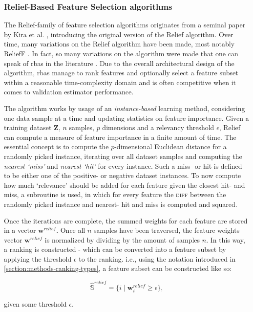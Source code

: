 \documentclass[../main.tex]{subfiles}
\begin{document}
\subsubsection{Relief-Based Feature Selection algorithms}
The Relief-family of feature selection algorithms originates from a seminal paper by Kira et al. \citep{kira_feature_1992}, introducing the original version of the Relief algorithm. Over time, many variations on the Relief algorithm have been made, most notably ReliefF \citep{kononenko_estimating_1994}. In fact, so many variations on the algorithm were made that one can speak of \glspl{rba} in the literature \citep{urbanowicz_relief-based_2018}. Due to the overall architectural design of the algorithm, \glspl{rba} manage to rank features and optionally select a feature subset within a reasonable time-complexity domain and is often competitive when it comes to validation estimator performance.

The algorithm works by usage of an \textit{instance-based} learning method, considering one data sample at a time and updating statistics on feature importance. Given a training dataset $\mathbf{Z}$, $n$ samples, $p$ dimensions and a relevancy threshold $\epsilon$, Relief can compute a measure of feature importance in a finite amount of time. The essential concept is to compute the $p$-dimensional Euclidean distance for a randomly picked instance, iterating over all dataset samples and computing the \textit{nearest `miss'} and \textit{nearest `hit'} for every instance. Such a miss- or hit is defined to be either one of the positive- or negative dataset instances. To now compute how much `relevance' should be added for each feature given the closest hit- and miss, a subroutine is used, in which for every feature the \textsc{diff} between the randomly picked instance and nearest- hit and miss is computed and squared.

Once the iterations are complete, the summed weights for each feature are stored in a vector $\boldsymbol{w}^{relief}$. Once all $n$ samples have been traversed, the feature weights vector $\boldsymbol{w}^{relief}$ is normalized by dividing by the amount of samples $n$. In this way, a ranking is constructed - which can be converted into a feature subset by applying the threshold $\epsilon$ to the ranking. i.e., using the notation introduced in \ref{section:methods-ranking-types}, a feature subset can be constructed like so:

\begin{equation}
\hat{\mathbb{S}}^{relief} = \{ i \mid \boldsymbol{w}^{relief}_i \geq \epsilon \},
\end{equation}

given some threshold $\epsilon$.


\biblio
\end{document}
